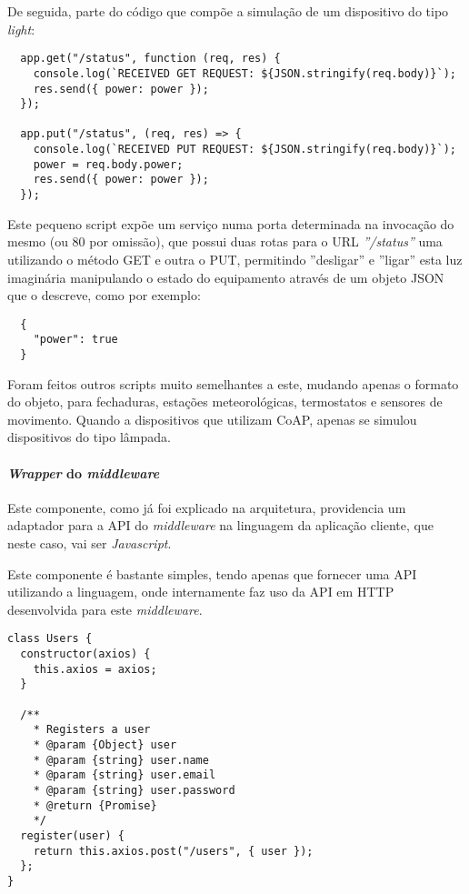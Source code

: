 De seguida, parte do código que compõe a simulação de um dispositivo do tipo \textit{light}:
\begin{verbatim}
  app.get("/status", function (req, res) {
    console.log(`RECEIVED GET REQUEST: ${JSON.stringify(req.body)}`);
    res.send({ power: power });
  });

  app.put("/status", (req, res) => {
    console.log(`RECEIVED PUT REQUEST: ${JSON.stringify(req.body)}`);
    power = req.body.power;
    res.send({ power: power });
  });
\end{verbatim}

Este pequeno script expõe um serviço numa porta determinada na invocação do mesmo (ou 80 por omissão), que possui duas rotas para o URL \textit{''/status''} uma utilizando o método GET e outra o PUT, permitindo ''desligar'' e ''ligar'' esta luz imaginária manipulando o estado do equipamento através de um objeto JSON que o descreve, como por exemplo:

\begin{verbatim}
  {
    "power": true
  }
\end{verbatim}

Foram feitos outros scripts muito semelhantes a este, mudando apenas o formato do objeto, para fechaduras, estações meteorológicas, termostatos e sensores de movimento. Quando a dispositivos que utilizam CoAP, apenas se simulou dispositivos do tipo lâmpada.

\paragraph*{\textit{Wrapper} do \textit{middleware}}

Este componente, como já foi explicado na arquitetura, providencia um adaptador para a API do \textit{middleware} na linguagem da aplicação cliente, que neste caso, vai ser \textit{Javascript}. 

Este componente é bastante simples, tendo apenas que fornecer uma API utilizando a linguagem, onde internamente faz uso da API em HTTP desenvolvida para este \textit{middleware}.

\begin{verbatim}
class Users {
  constructor(axios) {
    this.axios = axios;
  }

  /**
    * Registers a user
    * @param {Object} user
    * @param {string} user.name
    * @param {string} user.email
    * @param {string} user.password
    * @return {Promise}
    */
  register(user) {
    return this.axios.post("/users", { user });
  };
}
\end{verbatim}

